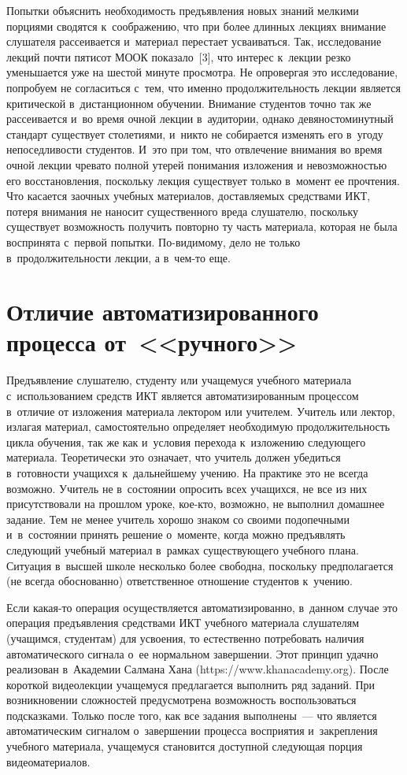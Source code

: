 \begin{multicols}{2}
  Попытки объяснить необходимость предъявления новых знаний мелкими 
порциями сводятся к~соображению, что при более длинных лекциях внимание 
слушателя рассеивается и~материал перестает усваиваться. Так, исследование 
лекций почти пятисот МООК показало~[3], что интерес к~лекции резко 
уменьшается уже на шестой минуте про\-смот\-ра. Не опровергая это 
исследование, попробуем не согласиться с~тем, что именно продолжительность 
лекции является критической в~дистанционном обучении. Внимание студентов 
точно так же рассеивается и~во время очной лекции в~аудитории, однако 
девяностоминутный стандарт существует столетиями, и~ни\-кто не собирается 
изменять его в~угоду непоседливости студентов. И~это при том, что отвлечение 
внимания во время очной лекции чревато полной утерей понимания изложения 
и невозможностью его восстановления, поскольку лекция существует только 
в~момент ее прочтения. Что касается заочных учебных материалов, 
доставляемых средствами ИКТ, потеря внимания не наносит существенного 
вреда слушателю, поскольку существует возможность получить повторно ту 
часть материала, которая не была воспринята с~первой попытки.  
По-ви\-ди\-мо\-му, дело не только в~продолжительности лекции, а в~чем-то еще.
  
\section{Отличие автоматизированного процесса от~<<ручного>>}

  Предъявление слушателю, студенту или учащемуся учебного материала 
с~использованием средств ИКТ является автоматизированным процессом 
в~отличие от изложения материала лектором или учителем. Учитель или 
лектор, излагая материал, самостоятельно определяет необходимую 
продолжительность цикла обучения, так же как и~условия перехода 
к~изложению следующего материала. Тео\-ре\-ти\-че\-ски это означает, что учитель 
должен убедиться в~готовности учащихся к~дальнейшему учению. На практике 
это не всегда возможно. Учитель не в~состоянии опросить всех учащихся, не 
все из них присутствовали на прошлом уроке, кое-кто, возможно, не выполнил 
домашнее задание. Тем не менее учитель хорошо знаком со своими 
подопечными и~в~состоянии принять решение о~моменте, когда можно 
предъявлять следующий учебный материал в~рамках существующего учебного 
плана. Ситуация в~высшей школе несколько более свободна, поскольку 
предполагается (не всегда обоснованно) ответственное отношение студентов 
к~учению.
  
  Если какая-то операция осуществляется автоматизированно, в~данном случае 
это операция предъявления средствами ИКТ учебного материала слушателям 
(учащимся, студентам) для усвоения, то естественно потребовать наличия 
автоматического сигнала о~ее нормальном завершении. Этот принцип удачно 
реализован в~Академии Салмана Хана ({\sf https://www.khanacademy.org}). 
После короткой видеолекции учащемуся предлагается выполнить ряд заданий. 
При возникновении сложностей предусмотрена возможность воспользоваться 
подсказками. Только после того, как все задания выполнены~--- что является 
автоматическим сигналом о~завершении процесса восприятия и~закрепления 
учебного материала, учащемуся становится доступной следующая порция 
видеоматериалов. 
  

\end{multicols}
